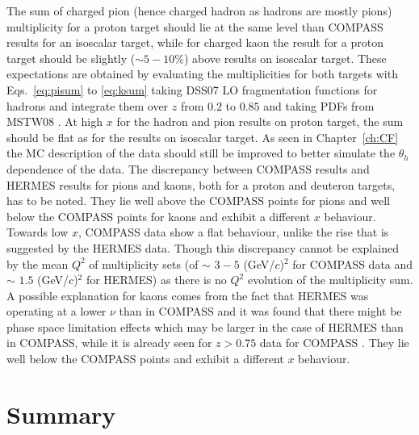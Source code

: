 The sum of charged pion (hence charged hadron as hadrons are mostly pions) multiplicity for a proton target should lie at the same level than COMPASS results for an isoscalar target, while for charged kaon the result for a proton target should be slightly ($\sim$$5-10$\%) above results on isoscalar target. These expectations are obtained by evaluating the multiplicities for both targets with Eqs.~\ref{eq:pisum} to \ref{eq:ksum} taking DSS07 \cite{DSS07} LO fragmentation functions for hadrons and integrate them over $z$ from $0.2$ to $0.85$ and taking PDFs from MSTW08 \cite{MSTW08}. At high $x$ for the hadron and pion results on proton target, the sum should be flat as for the results on isoscalar target. As seen in Chapter~\ref{ch:CF} the MC description of the data should still be improved to better simulate the $\theta_h$ dependence of the data. The discrepancy between COMPASS results and HERMES results for pions and kaons, both for a proton and deuteron targets, has to be noted. They lie well above the COMPASS points for pions and well below the COMPASS points for kaons and exhibit a different $x$ behaviour. Towards low $x$, COMPASS data show a flat behaviour, unlike the rise that is suggested by the HERMES data. Though this discrepancy cannot be explained by the mean $Q^2$ of multiplicity sets (of $\sim$ $3-5$ (GeV/$c$)$^2$ for COMPASS data and $\sim$ $1.5$ (GeV/$c$)$^2$ for HERMES) as there is no $Q^2$ evolution of the multiplicity sum. A possible explanation for kaons comes from the fact that HERMES was operating at a lower $\nu$ than in COMPASS and it was found that there might be phase space limitation effects which may be larger in the case of HERMES than in COMPASS, while it is already seen for $z>0.75$ data for COMPASS \cite{MarcinPubli}. They lie well below the COMPASS points and exhibit a different $x$ behaviour.

\newpage

\section{Summary}

